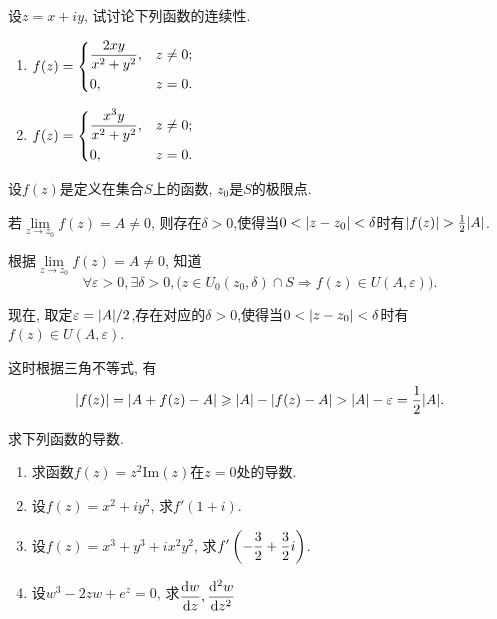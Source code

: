 \begin{yyEx}
	设$z = x+iy$, 试讨论下列函数的连续性.
	\begin{enumerate}
		\item $
		\begin{lgathered}
		f(z) = \begin{dcases}
		\frac{2xy}{x^2+y^2}, &z\neq 0;\\
		0,&z=0.
		\end{dcases}
		\end{lgathered}
		$
		
		\item $\begin{lgathered}
		f(z) = \begin{dcases}
		\frac{x^3y}{x^2+y^2}, &z\neq 0;\\
		0,&z=0.
		\end{dcases}
		\end{lgathered}$
	\end{enumerate}
\end{yyEx}

\begin{yyEx}
	设$f(z)$是定义在集合$S$上的函数, $z_0$是$S$的极限点.
	
	若$\lim\limits_{z\to z_0}f(z) = A\neq 0$, 则存在$\delta>0$,使得当$0<\lvert z-z_0\rvert<\delta$时有$\lvert f(z)\rvert>\frac{1}{2}\lvert A\rvert$.
\end{yyEx}

\begin{yyProof}
	根据$\lim\limits_{z\to z_0}f(z) = A\neq 0$, 知道
	\begin{equation*}
	\forall\varepsilon>0,\exists\delta>0, \bigg(
	z\in U_0(z_0,\delta)\cap S\Rightarrow f(z)\in U(A,\varepsilon)
	\bigg).
	\end{equation*}
		
	现在, 取定$\varepsilon = \lvert A\rvert/2$,存在对应的$\delta>0$,使得当$0<\lvert z-z_0\rvert<\delta$时有$f(z)\in U(A,\varepsilon)$.
	
	这时根据三角不等式, 有\begin{equation*}
		\lvert f(z)\rvert = \lvert A+f(z)-A\rvert \geqslant \lvert A\rvert - \lvert f(z)-A\rvert > \lvert A\rvert - \varepsilon = \frac{1}{2}\lvert A\rvert.
	\end{equation*}
	
\end{yyProof}

\begin{yyEx}
	求下列函数的导数.
	\begin{enumerate}
		\item 求函数$f(z) = z^2\mathrm{Im}(z)$在$z=0$处的导数.
		\item 设$f(z) = x^2 + iy^2$, 求$f'(1+i)$.
		\item 设$f(z) = x^3+y^3+ix^2y^2$, 求$\begin{lgathered}f'\left( -\frac{3}{2}+\frac{3}{2}i \right)\end{lgathered}$.
		\item 设$w^3-2zw+e^z = 0$, 求$\begin{lgathered}\frac{\mathrm{d}w}{\mathrm{d}z},\frac{\mathrm{d}^2w}{\mathrm{d}z^2}\end{lgathered}$
	\end{enumerate}
\end{yyEx}

